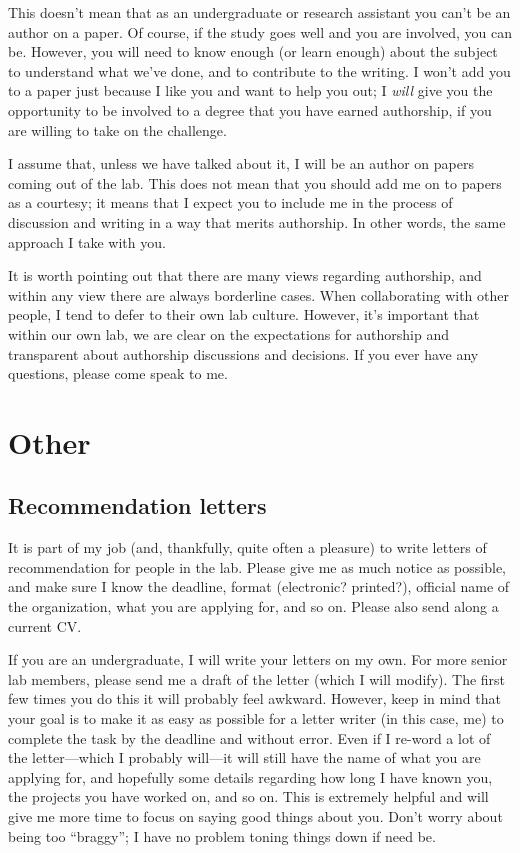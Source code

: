 \documentclass[letterpaper,12pt,oneside]{memoir}
\begin{document}
This doesn't mean that as an undergraduate or research assistant you can't be an author on a paper. Of course, if the study goes well and you are involved, you can be. However, you will need to know enough (or learn enough) about the subject to understand what we've done, and to contribute to the writing. I won't add you to a paper just because I like you and want to help you out; I {\itshape will} give you the opportunity to be involved to a degree that you have earned authorship, if you are willing to take on the challenge.

I assume that, unless we have talked about it, I will be an author on papers coming out of the lab. This does not mean that you should add me on to papers as a courtesy; it means that I expect you to include me in the process of discussion and writing in a way that merits authorship. In other words, the same approach I take with you.

It is worth pointing out that there are many views regarding authorship, and within any view there are always borderline cases. When collaborating with other people, I tend to defer to their own lab culture. However, it's important that within our own lab, we are clear on the expectations for authorship and transparent about authorship discussions and decisions. If you ever have any questions, please come speak to me.


\chapter{Other}
\section{Recommendation letters}
It is part of my job (and, thankfully, quite often a pleasure) to write letters of recommendation for people in the lab. Please give me as much notice as possible, and make sure I know the deadline, format (electronic? printed?), official name of the organization, what you are applying for, and so on. Please also send along a current CV.

If you are an undergraduate, I will write your letters on my own. For more senior lab members, please send me a draft of the letter (which I will modify). The first few times you do this it will probably feel awkward. However, keep in mind that your goal is to make it as easy as possible for a letter writer (in this case, me) to complete the task by the deadline and without error. Even if I re-word a lot of the letter---which I probably will---it will still have the name of what you are applying for, and hopefully some details regarding how long I have known you, the projects you have worked on, and so on. This is extremely helpful and will give me more time to focus on saying good things about you. Don't worry about being too ``braggy''; I have no problem toning things down if need be.
\end{document}
